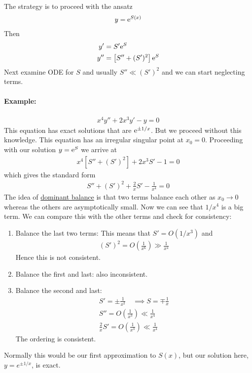 The strategy is to proceed with the ansatz
\begin{align*}
	y = \mathrm{e}^{S(x)}
\end{align*}
Then 
\begin{align*}
	y' &= S'\mathrm{e}^S \\
	y'' &= \left[S'' + (S')^2\right] \mathrm{e}^S
\end{align*}
Next examine ODE for $S$ and usually $S'' \ll (S')^2$ and we can start neglecting terms.

\paragraph{Example:} 
\begin{gather*}
	x^4 y'' + 2x^3 y' - y = 0
\end{gather*}
This equation has exact solutions that are $\mathrm{e}^{\pm 1/x}$. But we proceed without this knowledge. This equation has an irregular singular point at $x_0=0$. Proceeding with our solution $y = \mathrm{e}^S$ we arrive at
\begin{gather*}
	x^4\left[S'' + (S')^2\right] + 2x^3 S' - 1 = 0
\end{gather*}
which gives the standard form
\begin{gather*}
	S'' + (S')^2 + \frac{2}{x}S' - \frac{1}{x^4} = 0
\end{gather*}
The idea of \underline{dominant balance} is that two terms balance each other as $x_0 \rightarrow 0$ whereas the others are asymptotically small. Now we can see that $1/x^4$ is a big term. We can compare this with the other terms and check for consistency:

\begin{enumerate}
	\item Balance the last two terms: This means that $S' = O(1/x^3)$ and
	\begin{gather*}
		(S')^2 = O\left(\frac{1}{x^6}\right) \gg \frac{1}{x^4}
	\end{gather*}
	Hence this is not consistent.
	\item Balance the first and last: also inconsistent.
	\item Balance the second and last: 
	\begin{gather*}
		S' = \pm \frac{1}{x^2} \quad \implies S = \mp \frac{1}{x}\\
		S'' = O\left(\frac{1}{x^3}\right) \ll \frac{1}{x^4} \\
		\frac{2}{x}S'= O \left(\frac{1}{x^3}\right) \ll \frac{1}{x^4}
	\end{gather*} 
	The ordering is consistent.
\end{enumerate}
Normally this would be our first approximation to $S(x)$, but our solution here, $y = e^{\pm 1/x}$, is exact.

